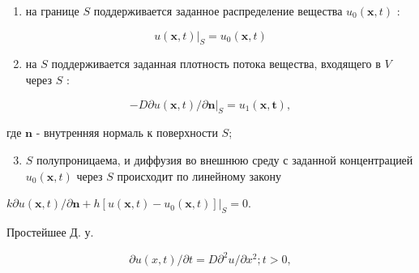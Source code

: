 \documentclass[10pt]{article}
\begin{document}
\begin{enumerate}

  \item на границе $S$ поддерживается заданное распределение вещества $u_{0}(\boldsymbol{x}, t)$ :

\end{enumerate}



\[

\left.u(\boldsymbol{x}, t)\right|_{S}=u_{0}(\boldsymbol{x}, t)

\]



\begin{enumerate}

  \setcounter{enumi}{1}

  \item на $S$ поддерживается заданная плотность потока вещества, входящего в $V$ через $S$ :

\end{enumerate}



\[

-D \partial u(\boldsymbol{x}, t) /\left.\partial \boldsymbol{n}\right|_{S}=u_{1}(\boldsymbol{x}, \boldsymbol{t}),

\]



где $\boldsymbol{n}$ - внутренняя нормаль к поверхности $S$;



\begin{enumerate}

  \setcounter{enumi}{2}

  \item $S$ полупроницаема, и диффузия во внешнюю среду с заданной концентрацией $u_{0}(\boldsymbol{x}, t)$ через $S$ происходит по линейному закону

\end{enumerate}



$k \partial u(\boldsymbol{x}, t) / \partial \boldsymbol{n}+\left.h\left[u(\boldsymbol{x}, t)-u_{0}(\boldsymbol{x}, t)\right]\right|_{S}=0$.



Простейшее Д. у.



\[

\partial u(x, t) / \partial t=D \partial^{2} u / \partial x^{2} ; t>0,

\]
\end{document}
